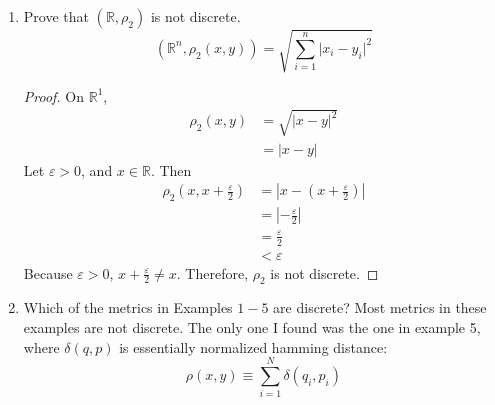 \documentclass{article}
\begin{document}
\begin{enumerate}
\begin{enumerate}
\begin{proof}
                              $\delta(x,y)<\varepsilon\implies x=y$ for all $\varepsilon<1$.
                        \end{proof}
                  \item Prove that $(\mathbb{R}, \rho_2)$ is not discrete.
                        \begin{equation}
                              (\mathbb{R}^n,\rho_2(x,y)) = \sqrt{\sum_{i=1}^n\lvert x_i-y_i\rvert^2}
                        \end{equation}
                        \begin{proof}
                              On $\mathbb{R}^1$,
                              \begin{align*}
                                    \rho_2(x,y) & = \sqrt{\lvert x-y\rvert^2} \\
                                                & = \lvert x-y\rvert
                              \end{align*}
                              Let $\varepsilon>0$, and $x\in\mathbb{R}$. Then
                              \begin{align*}
                                    \rho_2(x, x+\frac{\varepsilon}{2}) & = \left\lvert x-(x+\frac{\varepsilon}{2})\right\rvert \\
                                                                       & = \left\lvert -\frac{\varepsilon}{2}\right\rvert      \\
                                                                       & = \frac{\varepsilon}{2}                               \\
                                                                       & < \varepsilon
                              \end{align*}
                              Because $\varepsilon>0$, $x+\frac{\varepsilon}{2}\neq x$. Therefore, $\rho_2$
                              is not discrete.
                        \end{proof}
                  \item Which of the metrics in Examples $1-5$ are discrete?
                        \medbreak
                        Most metrics in these examples are not discrete. The only one I found
                        was the one in example 5, where $\delta(q, p)$ is essentially normalized hamming
                        distance:
                        \begin{equation}
                              \rho(x,y) \equiv \sum_{i=1}^N\delta(q_i, p_i)

\end{equation}
\end{enumerate}
\end{enumerate}
\end{document}
